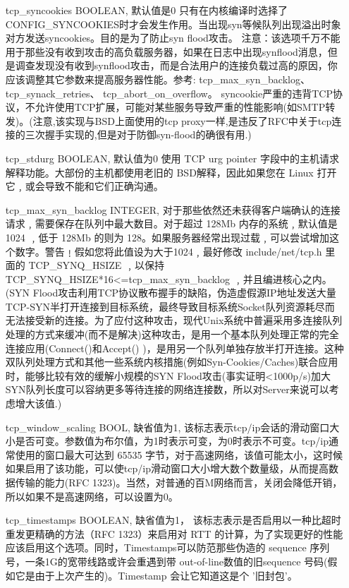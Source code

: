\begin{enumerate}
\item[tcp\_syncookies] BOOLEAN,
默认值是0
只有在内核编译时选择了CONFIG\_SYNCOOKIES时才会发生作用。当出现syn等候队列出现溢出时象对方发送syncookies。目的是为了防止syn flood攻击。
注意：该选项千万不能用于那些没有收到攻击的高负载服务器，如果在日志中出现synflood消息，但是调查发现没有收到synflood攻击，而是合法用户的连接负载过高的原因，你应该调整其它参数来提高服务器性能。参考:
    tcp\_max\_syn\_backlog、
    tcp\_synack\_retries、
    tcp\_abort\_on\_overflow。
syncookie严重的违背TCP协议，不允许使用TCP扩展，可能对某些服务导致严重的性能影响(如SMTP转发)。(注意,该实现与BSD上面使用的tcp proxy一样,是违反了RFC中关于tcp连接的三次握手实现的,但是对于防御syn-flood的确很有用.)

\item[tcp\_stdurg] BOOLEAN,
默认值为0
使用 TCP urg pointer 字段中的主机请求解释功能。大部份的主机都使用老旧的 BSD解释，因此如果您在 Linux 打开它﹐或会导致不能和它们正确沟通。

\item[tcp\_max\_syn\_backlog] INTEGER,
对于那些依然还未获得客户端确认的连接请求﹐需要保存在队列中最大数目。对于超过 128Mb 内存的系统﹐默认值是1024 ﹐低于 128Mb 的则为 128。如果服务器经常出现过载﹐可以尝试增加这个数字。警告﹗假如您将此值设为大于1024﹐最好修改 include/net/tcp.h 里面的 TCP\_SYNQ\_HSIZE ﹐以保持TCP\_SYNQ\_HSIZE*16<=tcp\_max\_syn\_backlog ﹐并且编进核心之内。(SYN Flood攻击利用TCP协议散布握手的缺陷，伪造虚假源IP地址发送大量TCP-SYN半打开连接到目标系统，最终导致目标系统Socket队列资源耗尽而无法接受新的连接。为了应付这种攻击，现代Unix系统中普遍采用多连接队列处理的方式来缓冲(而不是解决)这种攻击，是用一个基本队列处理正常的完全连接应用(Connect()和Accept() )，是用另一个队列单独存放半打开连接。这种双队列处理方式和其他一些系统内核措施(例如Syn-Cookies/Caches)联合应用时，能够比较有效的缓解小规模的SYN Flood攻击(事实证明<1000p/s)加大SYN队列长度可以容纳更多等待连接的网络连接数，所以对Server来说可以考虑增大该值.)

\item[tcp\_window\_scaling] BOOL,
							缺省值为1,
							该标志表示tcp/ip会话的滑动窗口大小是否可变。参数值为布尔值，为1时表示可变，为0时表示不可变。tcp/ip通常使用的窗口最大可达到 65535 字节，对于高速网络，该值可能太小，这时候如果启用了该功能，可以使tcp/ip滑动窗口大小增大数个数量级，从而提高数据传输的能力(RFC 1323)。当然，对普通的百M网络而言，关闭会降低开销，所以如果不是高速网络，可以设置为0。

\item[tcp\_timestamps] BOOLEAN,
						缺省值为1，
						该标志表示是否启用以一种比超时重发更精确的方法（RFC 1323）来启用对 RTT 的计算，为了实现更好的性能应该启用这个选项。同时，Timestamps可以防范那些伪造的 sequence 序列号，一条1G的宽带线路或许会重遇到带 out-of-line数值的旧sequence 号码(假如它是由于上次产生的)。Timestamp 会让它知道这是个 '旧封包'。


\end{enumerate}
